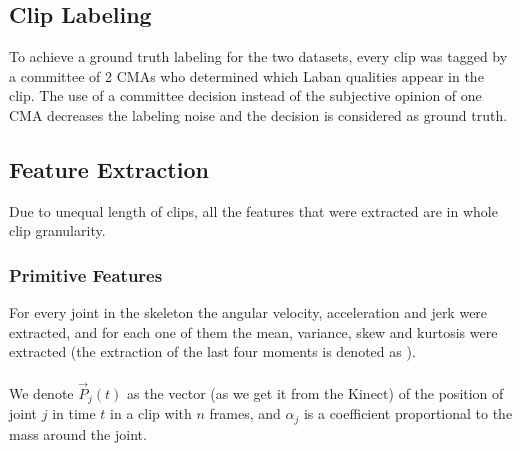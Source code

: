 \documentclass[journal]{journal}
\begin{document}
\subsection{Clip Labeling}
To achieve a ground truth labeling for the two datasets, every clip was tagged by
a committee of 2 CMAs who determined which Laban qualities appear in the
clip. The use of a committee decision instead of the subjective opinion of one
CMA decreases the labeling noise and the decision is considered as ground truth.
\subsection{Feature Extraction}
Due to unequal length of clips, all the features that were extracted are in
whole clip granularity.
\subsubsection{Primitive Features}
For every joint in the skeleton the angular velocity, acceleration and jerk were
extracted, and for each one of them the mean, variance, skew and kurtosis were
extracted (the extraction of the last four moments is denoted as \phi). 
\\\\We denote $\vec{P}_{j}(t)$ as the vector (as we get it from the Kinect) of
the position of joint $j$ in time $t$ in a clip with $n$ frames, and
$\alpha_{j}$ is a coefficient proportional to the mass around the joint.
\end{document}
